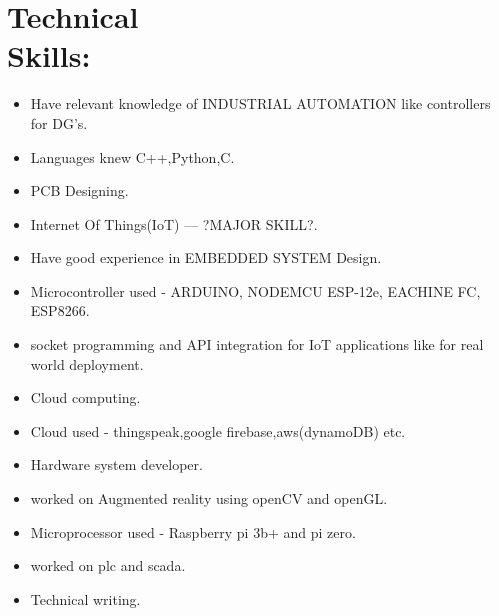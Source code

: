 \documentclass[10pt]{report}
\begin{document}
\section*{Technical \\Skills:} %
\begin{itemize}
\item Have relevant knowledge of INDUSTRIAL AUTOMATION like controllers for DG's.
\item Languages knew C++,Python,C.
\item PCB Designing.
\item Internet Of Things(IoT) --- ?MAJOR SKILL?. 
\item Have good experience in EMBEDDED SYSTEM Design.
\item Microcontroller used - ARDUINO, NODEMCU ESP-12e, EACHINE FC, ESP8266.
\item socket programming and API integration for IoT applications like for real world deployment.
\item Cloud computing.
\item Cloud used - thingspeak,google firebase,aws(dynamoDB) etc.
\item Hardware system developer.
\item worked on Augmented reality using openCV and openGL.
\item Microprocessor used - Raspberry pi 3b+ and pi zero.
\item worked on plc and scada.
\item Technical writing.
\end{itemize}
\end{document}
